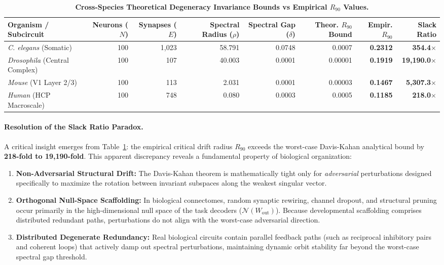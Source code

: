 \documentclass[11pt,letterpaper]{report}
\begin{document}
\begin{table}[t]
\centering
\small
\caption{\textbf{Cross-Species Theoretical Degeneracy Invariance Bounds vs Empirical $R_{90}$ Values.}}
\label{tab:theory_bounds}
\begin{tabular}{lrrrrrrr}
\toprule
\textbf{Organism / Subcircuit} & \textbf{Neurons ($N$)} & \textbf{Synapses ($E$)} & \textbf{Spectral Radius ($\rho$)} & \textbf{Spectral Gap ($\delta$)} & \textbf{Theor. $R_{90}$ Bound} & \textbf{Empir. $R_{90}$} & \textbf{Slack Ratio} \\
\midrule
\textit{C. elegans} (Somatic) & 100 & 1,023 & 58.791 & 0.0748 & 0.0007 & \textbf{0.2312} & \textbf{354.4$\times$} \\
\textit{Drosophila} (Central Complex) & 100 & 107 & 40.003 & 0.0001 & 0.00001 & \textbf{0.1919} & \textbf{19,190.0$\times$} \\
\textit{Mouse} (V1 Layer 2/3) & 100 & 113 & 2.031 & 0.0001 & 0.00003 & \textbf{0.1467} & \textbf{5,307.3$\times$} \\
\textit{Human} (HCP Macroscale) & 100 & 748 & 0.080 & 0.0003 & 0.0005 & \textbf{0.1185} & \textbf{218.0$\times$} \\
\bottomrule
\end{tabular}
\end{table}

\paragraph{Resolution of the Slack Ratio Paradox.}
A critical insight emerges from Table~\ref{tab:theory_bounds}: the empirical critical drift radius $R_{90}$ exceeds the worst-case Davis-Kahan analytical bound by \textbf{218-fold to 19,190-fold}. 
This apparent discrepancy reveals a fundamental property of biological organization:
\begin{enumerate}[leftmargin=*]
    \item \textbf{Non-Adversarial Structural Drift:} The Davis-Kahan theorem is mathematically tight only for \textit{adversarial} perturbations designed specifically to maximize the rotation between invariant subspaces along the weakest singular vector.
    \item \textbf{Orthogonal Null-Space Scaffolding:} In biological connectomes, random synaptic rewiring, channel dropout, and structural pruning occur primarily in the high-dimensional null space of the task decoders ($\mathcal{N}(W_{\mathrm{out}})$). Because developmental scaffolding comprises distributed redundant paths, perturbations do not align with the worst-case adversarial direction.
    \item \textbf{Distributed Degenerate Redundancy:} Real biological circuits contain parallel feedback paths (such as reciprocal inhibitory pairs and coherent loops) that actively damp out spectral perturbations, maintaining dynamic orbit stability far beyond the worst-case spectral gap threshold.
\end{enumerate}
\end{document}
